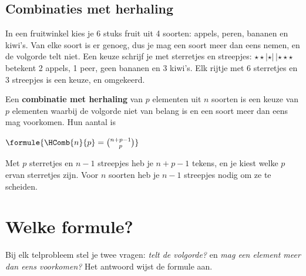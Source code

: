 \subsection{Combinaties met herhaling}

In een fruitwinkel kies je 6 stuks fruit uit 4 soorten: appels, peren, bananen en kiwi's. Van elke soort is er genoeg, dus je mag een soort meer dan eens nemen, en de volgorde telt niet. Een keuze schrijf je met sterretjes en streepjes: $\star\star|\star|\,|\star\star\star$ betekent 2 appels, 1 peer, geen bananen en 3 kiwi's. Elk rijtje met 6 sterretjes en 3 streepjes is een keuze, en omgekeerd.

\begin{theorie}
Een \textbf{\textcolor{accent}{combinatie met herhaling}} van $p$ elementen uit $n$ soorten is een keuze van $p$ elementen waarbij de volgorde niet van belang is en een soort meer dan eens mag voorkomen. Hun aantal is

\vspace{1mm}
\qquad $\formule{\HComb{n}{p} = \binom{n + p - 1}{p}}$
\end{theorie}

Met $p$ sterretjes en $n - 1$ streepjes heb je $n + p - 1$ tekens, en je kiest welke $p$ ervan sterretjes zijn. Voor $n$ soorten heb je $n - 1$ streepjes nodig om ze te scheiden.


\begin{oefeningen}
\end{oefeningen}

\section{Welke formule?}

Bij elk telprobleem stel je twee vragen: \textit{telt de volgorde?} en \textit{mag een element meer dan eens voorkomen?} Het antwoord wijst de formule aan.

